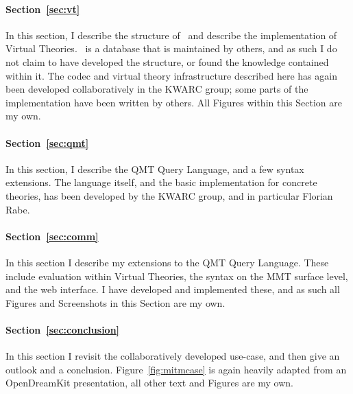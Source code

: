\paragraph*{Section~\ref{sec:vt}}
In this section, I describe the structure of \lmfdb\ and describe the implementation of Virtual Theories. 
\lmfdb\ is a database that is maintained by others, and as such I do not claim to have developed the structure, or found the knowledge contained within it. 
The codec and virtual theory infrastructure described here has again been developed collaboratively in the KWARC group; some parts of the implementation have been written by others. 
All Figures within this Section are my own. 

\paragraph*{Section~\ref{sec:qmt}}
In this section, I describe the QMT Query Language, and a few syntax extensions. 
The language itself, and the basic implementation for concrete theories, has been developed by the KWARC group, and in particular Florian Rabe. 

\paragraph*{Section~\ref{sec:comm}}
In this section I describe my extensions to the QMT Query Language. 
These include evaluation within Virtual Theories, the syntax on the MMT surface level, and the web interface. 
I have developed and implemented these, and as such all Figures and Screenshots in this Section are my own. 

\paragraph*{Section~\ref{sec:conclusion}}
In this section I revisit the collaboratively developed use-case, and then give an outlook and a conclusion. 
Figure~\ref{fig:mitmcase} is again heavily adapted from an OpenDreamKit presentation, all other text and Figures are my own. 